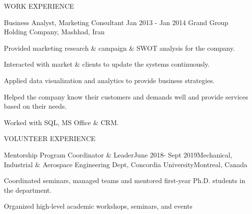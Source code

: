 \documentclass{resume} %
\begin{document}
\begin{rSection}{WORK EXPERIENCE}
\begin{rSubsection} {Business Analyst, Marketing Consultant} {Jan 2013 - Jan 2014}{ Grand Group Holding Company, Mashhad, Iran} {}
\item Provided marketing research \& campaign \& SWOT analysis for the company.
\item Interacted with market $\&$ clients to update the systems continuously.
\item Applied data visualization and analytics to provide business strategies.
\item Helped the company know their customers and demands well and provide services based on their needs.
\item Worked with SQL, MS Office \& CRM. 
\end{rSubsection}
 \end{rSection}
\begin{rSection}{VOLUNTEER EXPERIENCE}
\begin{rSubsection}{Mentorship Program Coordinator \& Leader}{June 2018-  Sept 2019}{Mechanical, Industrial $\&$ Aerospace Engineering Dept, Concordia University}{Montreal, Canada} 
    \item Coordinated seminars, managed teams and mentored first-year Ph.D. students in the department.
\item Organized high-level academic workshops, seminars, and events
\end{rSubsection}
\end{rSection}
\end{document}
